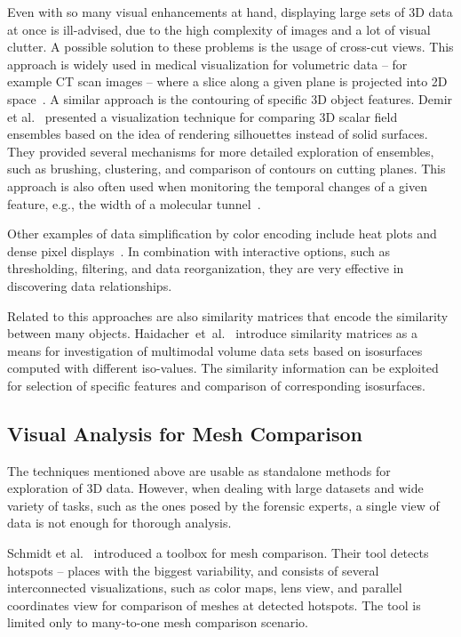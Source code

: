\documentclass[final,5p,times]{elsarticle}
\begin{document}
Even with so many visual enhancements at hand, displaying large sets of 3D data at once is ill-advised, due to the high complexity of images and a lot of visual clutter. 
A possible solution to these problems is the usage of cross-cut views. 
This approach is widely used in medical visualization for volumetric data -- for example CT scan images -- where a slice along a given plane is projected into 2D space~\cite{friese2011yadiv}. 
A similar approach is the contouring of specific 3D object features.
Demir et al.~\cite{demir2016screen} presented a visualization technique for
comparing 3D scalar field ensembles based on the idea of rendering silhouettes instead of solid surfaces.
They provided several mechanisms for more detailed exploration of ensembles, such as brushing, clustering, and comparison of contours on cutting planes.
This approach is also often used when monitoring the temporal changes of a given feature, e.g., the width of a molecular tunnel~\cite{byska}.

Other examples of data simplification by color encoding include heat plots and dense pixel displays~\cite{byska,ivanisiev,zhai}. 
In combination with interactive options, such as thresholding, filtering, and data reorganization, they are very effective in discovering data relationships.

\begin{sloppypar}
Related to this approaches are also similarity matrices that encode the similarity between many objects. Haidacher~et~al.~\cite{haidacher2011volume} introduce similarity matrices as a means for investigation of multimodal volume data sets based on isosurfaces computed with different iso-values. The similarity information can be exploited for selection of specific features and comparison of corresponding isosurfaces.
\end{sloppypar}

\subsection{Visual Analysis for Mesh Comparison}
The techniques mentioned above are usable as standalone methods for exploration of 3D data.
However, when dealing with large datasets and wide variety of tasks, such as the ones posed by the forensic experts, a single view of data is not enough for thorough analysis.

Schmidt et al.~\cite{ymca} introduced a toolbox for mesh comparison.
Their tool detects hotspots -- places with the biggest variability, and consists of several interconnected visualizations, such as color maps, lens view, and parallel coordinates view for comparison of meshes at detected hotspots.
The tool is limited only to many-to-one mesh comparison scenario.
\end{document}

